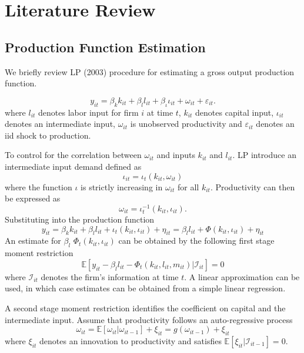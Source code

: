 \documentclass[11pt]{article}
\begin{document}
\section{Literature Review}
\subsection{Production Function Estimation}

We briefly review LP (2003) procedure for estimating a gross output production function.

\begin{equation}
y_{it}=\beta_{k}k_{it}+\beta_{l}l_{it}+\beta_{\iota}\iota_{it}+\omega_{it}+\varepsilon_{it}.
\end{equation}
where $l_{it}$ denotes labor input for firm $i$ at time $t$, $k_{it}$ denotes capital input, $\iota_{it}$ denotes an intermediate input, $\omega_{it}$ is unobserved productivity and $\varepsilon_{it}$ denotes an iid shock to production.

To control for the correlation between $\omega_{it}$ and inputs $k_{it}$ and $l_{it}$. LP introduce an intermediate input demand defined as
\begin{equation}
\iota_{it}=\iota_{t}(k_{it}, \omega_{it})
\end{equation}
where the function $\iota$ is strictly increasing in $\omega_{it}$ for all $k_{it}$. Productivity can then be expressed as
\begin{equation}
\omega_{it}=\iota_{t}^{-1}(k_{it}, \iota_{it}).
\end{equation}
Substituting into the production function
\begin{equation}
y_{it}=\beta_{k}k_{it}+\beta_{l}l_{it}+\iota_{t}(k_{it}, \iota_{it})+\eta_{it}=\beta_{l}l_{it}+\Phi(k_{it}, \iota_{it})+\eta_{it}
\end{equation}
An estimate for $\beta_{l}$ $\Phi_{t}(k_{it}, \iota_{it})$ can be obtained by the following first stage moment restriction
\begin{equation}
\mathbb{E}[y_{it}-\beta_{l}l_{it}-\Phi_{t}(k_{it}, l_{it}, m_{it})|\mathcal{I}_{it}]=0
\end{equation}
where $\mathcal{I}_{it}$ denotes the firm's information at time $t$. A linear approximation can be used, in which case estimates can be obtained from a simple linear regression.

A second stage moment restriction identifies the coefficient on capital and the intermediate input. Assume that productivity follows an auto-regressive process
\begin{equation}
\omega_{it}=\mathbb{E}[\omega_{it}|\omega_{it-1}]+\xi_{it}=g(\omega_{it-1})+\xi_{it}
\end{equation}
where $\xi_{it}$ denotes an innovation to productivity and satisfies $\mathbb{E}[\xi_{it}|\mathcal{I}_{it-1}]=0$.
\end{document}
